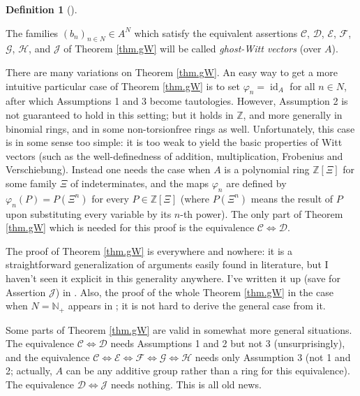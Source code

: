 \documentclass[numbers=enddot,12pt,final,onecolumn,notitlepage]{scrartcl}%
\theoremstyle{definition}
\newtheorem{defi}[theo]{Definition}
\newenvironment{definition}[1][]
{\begin{defi}[#1]\begin{leftbar}}
{\end{leftbar}\end{defi}}
\begin{document}
\begin{definition}
The families $\left(  b_{n}\right)  _{n\in N}\in A^{N}$ which satisfy the
equivalent assertions $\mathcal{C}$, $\mathcal{D}$, $\mathcal{E}$,
$\mathcal{F}$, $\mathcal{G}$, $\mathcal{H}$, and $\mathcal{J}$ of Theorem
\ref{thm.gW} will be called \textit{ghost-Witt vectors} (over $A$).
\end{definition}

There are many variations on Theorem \ref{thm.gW}. An easy way to get a more
intuitive particular case of Theorem \ref{thm.gW} is to set $\varphi
_{n}=\operatorname*{id}\nolimits_{A}$ for all $n\in N$, after which
Assumptions 1 and 3 become tautologies. However, Assumption 2 is not
guaranteed to hold in this setting; but it holds in $\mathbb{Z}$, and more
generally in binomial rings, and in some non-torsionfree rings as well.
Unfortunately, this case is in some sense too simple: it is too weak to yield
the basic properties of Witt vectors (such as the well-definedness of
addition, multiplication, Frobenius and Verschiebung). Instead one needs the
case when $A$ is a polynomial ring $\mathbb{Z}\left[  \Xi\right]  $ for some
family $\Xi$ of indeterminates, and the maps $\varphi_{n}$ are defined by
$\varphi_{n}\left(  P\right)  =P\left(  \Xi^{n}\right)  $ for every
$P\in\mathbb{Z}\left[  \Xi\right]  $ (where $P\left(  \Xi^{n}\right)  $ means
the result of $P$ upon substituting every variable by its $n$-th power). The
only part of Theorem \ref{thm.gW} which is needed for this proof is the
equivalence $\mathcal{C}\Longleftrightarrow\mathcal{D}$.

The proof of Theorem \ref{thm.gW} is everywhere and nowhere: it is a
straightforward generalization of arguments easily found in literature, but I
haven't seen it explicit in this generality anywhere. I've written it up (save
for Assertion $\mathcal{J}$) in \cite[Theorem 11]{dg-witt5}. Also, the proof
of the whole Theorem \ref{thm.gW} in the case when $N=\mathbb{N}_{+}$ appears
in \cite[Exercise 2.9.6]{reiner-hopf}; it is not hard to derive the general
case from it.

Some parts of Theorem \ref{thm.gW} are valid in somewhat more general
situations. The equivalence $\mathcal{C}\Longleftrightarrow\mathcal{D}$ needs
Assumptions 1 and 2 but not 3 (unsurprisingly), and the equivalence
$\mathcal{C}\Longleftrightarrow\mathcal{E}\Longleftrightarrow\mathcal{F}%
\Longleftrightarrow\mathcal{G}\Longleftrightarrow\mathcal{H}$ needs only
Assumption 3 (not 1 and 2; actually, $A$ can be any additive group rather than
a ring for this equivalence). The equivalence $\mathcal{D}\Longleftrightarrow
\mathcal{J}$ needs nothing. This is all old news.
\end{document}
